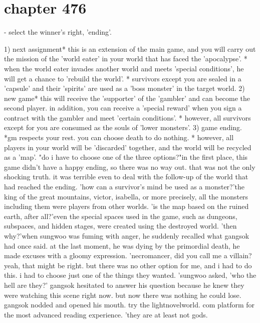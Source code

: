 \section{chapter 476}

- select the winner's right, 'ending'.





1) next assignment* this is an extension of the main game, and you will carry out the mission of the 'world eater' in your world that has faced the 'apocalypse'.
* when the world eater invades another world and meets 'special conditions', he will get a chance to 'rebuild the world'.
* survivors except you are sealed in a 'capsule' and their 'spirits' are used as a 'boss monster' in the target world.
2) new game* this will receive the 'supporter' of the 'gambler' and can become the second player.
 in addition, you can receive a 'special reward' when you sign a contract with the gambler and meet 'certain conditions'.
* however, all survivors except for you are consumed as the souls of 'lower monsters'.
3) game ending.
 *gm respects your rest.
 you can choose death to do nothing.
* however, all players in your world will be 'discarded' together, and the world will be recycled as a 'map'.
"do i have to choose one of the three options?"in the first place, this game didn't have a happy ending, so there was no way out.
that was not the only shocking truth.
 it was terrible even to deal with the follow-up of the world that had reached the ending.
'how can a survivor's mind be used as a monster?'the king of the great mountains, victor, isabella, or more precisely, all the monsters including them were players from other worlds.
'is the map based on the ruined earth, after all?'even the special spaces used in the game, such as dungeons, subspaces, and hidden stages, were created using the destroyed world.
'then why?'when sungwoo was fuming with anger, he suddenly recalled what gangsok had once said.
 at the last moment, he was dying by the primordial death, he made excuses with a gloomy expression.
'necromancer, did you call me a villain? yeah, that might be right.
 but there was no other option for me, and i had to do this.
 i had to choose just one of the things they wanted.
'sungwoo asked, 'who the hell are they?'
gangsok hesitated to answer his question because he knew they were watching this scene right now.
 but now there was nothing he could lose.
gangsok nodded and opened his mouth.
try the lightnovelworld.
com platform for the most advanced reading experience.
'they are at least not gods.
